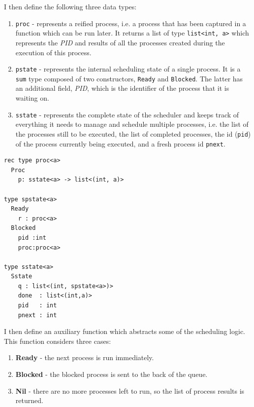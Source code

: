 \documentclass[logo,bsc,singlespacing,parskip]{infthesis}
\begin{document}
I then define the following three data types: 

\begin{enumerate}
    \item \lstinline{proc} - represents a reified process, i.e. a process that has been captured in a function which can be run later. It returns a list of type \lstinline{list<int, a>} which represents the \textit{PID} and results of all the processes created during the execution of this process.  

    \item \lstinline{pstate} - represents the internal scheduling state of a single process. It is a \lstinline{sum} type composed of two constructors, \lstinline{Ready} and \lstinline{Blocked}. The latter has an additional field, \textit{PID}, which is the identifier of the process that it is waiting on. 

    \item \lstinline{sstate} - represents the complete state of the scheduler and keeps track of everything it needs to manage and schedule multiple processes, i.e. the list of the processes still to be executed, the list of completed processes, the id (\lstinline{pid}) of the process currently being executed,  and a fresh process id \lstinline{pnext}.

\end{enumerate}


\begin{lstlisting}
rec type proc<a>
  Proc
    p: sstate<a> -> list<(int, a)>

type spstate<a>
  Ready
    r : proc<a>
  Blocked 
    pid :int 
    proc:proc<a>

type sstate<a> 
  Sstate     
    q : list<(int, spstate<a>)>
    done  : list<(int,a)>
    pid   : int
    pnext : int
\end{lstlisting}


I then define an auxiliary function which abstracts some of the scheduling logic. This function considers three cases:
\begin{enumerate}
    \item \textbf{Ready} - the next process is run immediately.
    \item \textbf{Blocked} - the blocked process is sent to the back of the queue.
    \item \textbf{Nil} - there are no more processes left to run, so the list of process results is returned.
\end{enumerate}
\end{document}

